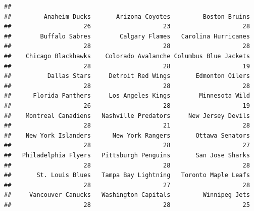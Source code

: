 \documentclass[]{article}
\begin{document}
\begin{verbatim}
## 
##         Anaheim Ducks       Arizona Coyotes         Boston Bruins 
##                    26                    23                    28 
##        Buffalo Sabres        Calgary Flames   Carolina Hurricanes 
##                    28                    28                    28 
##    Chicago Blackhawks    Colorado Avalanche Columbus Blue Jackets 
##                    28                    28                    19 
##          Dallas Stars     Detroit Red Wings       Edmonton Oilers 
##                    28                    28                    28 
##      Florida Panthers     Los Angeles Kings        Minnesota Wild 
##                    26                    28                    19 
##    Montreal Canadiens   Nashville Predators     New Jersey Devils 
##                    28                    21                    28 
##    New York Islanders      New York Rangers       Ottawa Senators 
##                    28                    28                    27 
##   Philadelphia Flyers   Pittsburgh Penguins       San Jose Sharks 
##                    28                    28                    28 
##       St. Louis Blues   Tampa Bay Lightning   Toronto Maple Leafs 
##                    28                    27                    28 
##     Vancouver Canucks   Washington Capitals         Winnipeg Jets 
##                    28                    28                    25
\end{verbatim}
\end{document}
